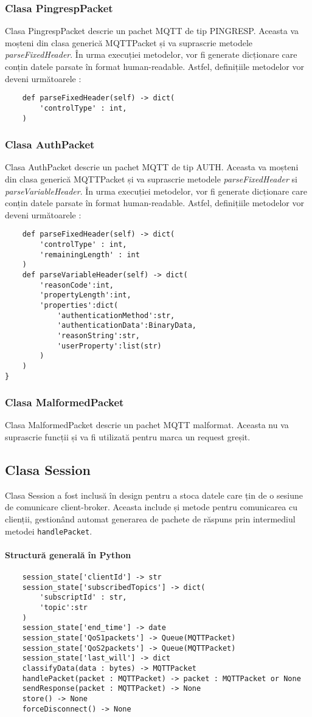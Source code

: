 \documentclass{report}
\begin{document}
\subsubsection{Clasa PingrespPacket}
Clasa PingrespPacket descrie un pachet MQTT de tip PINGRESP. Aceasta va moșteni din clasa generică MQTTPacket și va suprascrie metodele \emph{parseFixedHeader}.
În urma execuției metodelor, vor fi generate dicționare care conțin datele parsate în format human-readable.
Astfel, definițiile metodelor vor deveni următoarele : 
\\
\begin{verbatim}
	def parseFixedHeader(self) -> dict(
		'controlType' : int, 
	)
\end{verbatim}
\subsubsection{Clasa AuthPacket}
Clasa AuthPacket descrie un pachet MQTT de tip AUTH. Aceasta va moșteni din clasa generică MQTTPacket și va suprascrie metodele \emph{parseFixedHeader} si \emph{parseVariableHeader}.
În urma execuției metodelor, vor fi generate dicționare care conțin datele parsate în format human-readable.
Astfel, definițiile metodelor vor deveni următoarele : 
\\
\begin{verbatim}
	def parseFixedHeader(self) -> dict(
		'controlType' : int, 
		'remainingLength' : int
	) 
    def parseVariableHeader(self) -> dict(
    	'reasonCode':int,
    	'propertyLength':int,
    	'properties':dict(
    		'authenticationMethod':str,
    		'authenticationData':BinaryData,
    		'reasonString':str,
    		'userProperty':list(str)
    	)
    )
}
\end{verbatim}
\subsubsection{Clasa MalformedPacket}
Clasa MalformedPacket descrie un pachet MQTT malformat. Aceasta nu va suprascrie funcții și va fi utilizată pentru marca un request greșit.
\subsection{Clasa Session}
Clasa Session a fost inclusă în design pentru a stoca datele care țin de o sesiune de comunicare client-broker. Aceasta include și metode pentru comunicarea cu clienții, gestionând automat generarea de pachete de răspuns prin intermediul metodei \verb"handlePacket".
\paragraph{Structură generală în Python}
\begin{verbatim}
	session_state['clientId'] -> str
	session_state['subscribedTopics'] -> dict(
		'subscriptId' : str, 
		'topic':str
	)
	session_state['end_time'] -> date
	session_state['QoS1packets'] -> Queue(MQTTPacket)
	session_state['QoS2packets'] -> Queue(MQTTPacket)
	session_state['last_will'] -> dict
	classifyData(data : bytes) -> MQTTPacket
	handlePacket(packet : MQTTPacket) -> packet : MQTTPacket or None
	sendResponse(packet : MQTTPacket) -> None
	store() -> None
	forceDisconnect() -> None
\end{verbatim}
\end{document}
